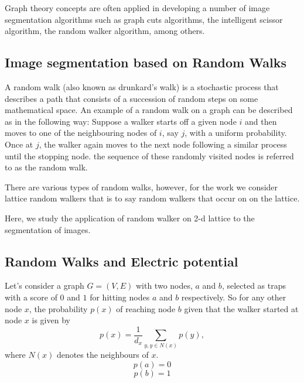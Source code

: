 \documentclass[10pt,a4paper]{article}
\begin{document}
Graph theory concepts are often applied in developing a number of image segmentation algorithms such as graph cuts algorithms, the intelligent scissor algorithm, the random walker algorithm, among others.

\subsection{Image segmentation based on Random Walks}
A random walk (also known as drunkard's walk) is a stochastic process that describes a path that consists of a succession of random steps on some mathematical space. An example of a random walk on a graph can be described as  in the following way:
Suppose a walker starts off a given node $i$ and then moves to one of the neighbouring nodes of $i$, say $j$, with a uniform probability. Once at $j$, the walker again moves to the next node following a similar process until the stopping node. the sequence of these randomly visited nodes is referred to as the random walk.

There are various types of random walks, however, for the work we consider lattice random walkers that is to say random walkers that occur on on the lattice.

Here, we study the application of random walker on 2-d lattice to the segmentation of images. 
  
\subsection{Random Walks and Electric potential}
Let's consider a graph $G=(V,E)$ with two nodes, $a$ and $b$, selected as traps with a score of $0$ and $1$ for hitting nodes $a$ and $b$ respectively. So for any other node $x$, the probability $p(x)$ of reaching node $b$ given that the walker started at node $x$ is given by
\begin{equation}
p(x) = \frac{1}{d_x} \sum_{y, y \in N(x)} p(y),
\label{eqnp1}
\end{equation}
where $N(x)$ denotes the neighbours of $x$.
\begin{equation}
p(a) = 0
\label{eqnp2}
\end{equation}
\begin{equation}
p(b) = 1
\label{eqnp3}
\end{equation}
\end{document}
